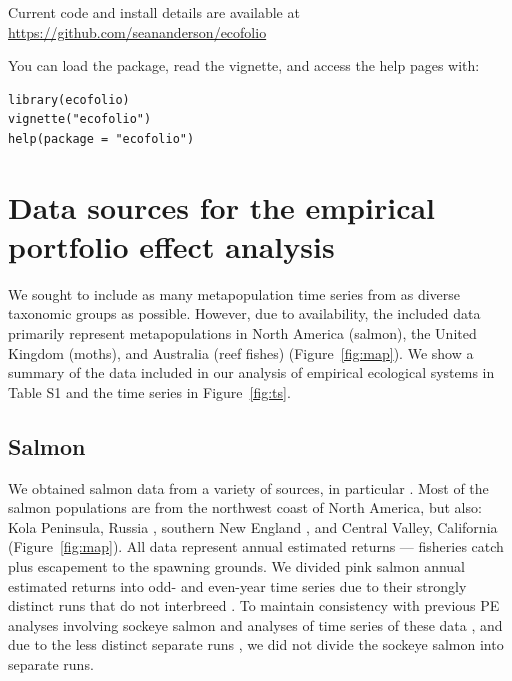 \noindent
Current code and install details are available at\\ \url{https://github.com/seananderson/ecofolio}
\clearpage


\noindent
You can load the package, read the vignette, and access the help pages with:

\begin{verbatim}
library(ecofolio)
vignette("ecofolio")
help(package = "ecofolio")
\end{verbatim}

\section{Data sources for the empirical portfolio effect analysis}
We sought to include as many metapopulation time series from as diverse
taxonomic groups as possible. However, due to availability, the included data
primarily represent metapopulations in North America (salmon), the United
Kingdom (moths), and Australia (reef fishes) (Figure~\ref{fig:map}). We show a
summary of the data included in our analysis of empirical ecological systems
in Table S1 and the time series in Figure~\ref{fig:ts}.

\subsection{Salmon}
We obtained salmon data from a variety of sources, in particular
\citet{dorner2008}. Most of the salmon populations are from the northwest
coast of North America, but also: Kola Peninsula, Russia
\citep{jensen1999}, southern New England \citep{kocik2006}, and
Central Valley, California \citep{carlson2011} (Figure~\ref{fig:map}). All
data represent annual estimated returns --- fisheries catch plus escapement to
the spawning grounds. We divided pink salmon annual estimated returns into odd-
and even-year time series due to their strongly distinct runs that do not
interbreed \citep{quinn2005}. To maintain consistency with previous PE
analyses involving sockeye salmon \citep{schindler2010} and analyses of
time series of these data \citep{dorner2008}, and due to the less distinct
separate runs \citep{quinn2005}, we did not divide the sockeye salmon into
separate runs.


